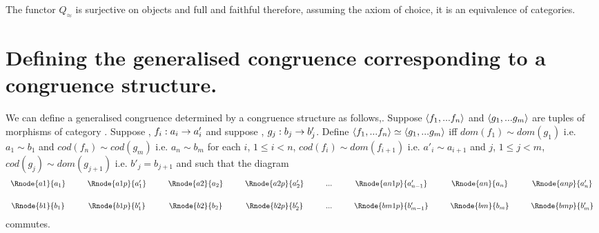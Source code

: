 \documentclass[10pt,a4paper]{article}
\theoremstyle{remark}
\begin{document}
The functor $Q_\approx$ is surjective on objects and full and faithful therefore, assuming the axiom of choice, it is an equivalence of categories. 

\section{Defining the generalised congruence corresponding to a congruence structure.}

We can define a generalised congruence determined by a congruence structure as follows,.
Suppose 
$\langle f_1,...f_n\rangle$ and $\langle g_1,...g_m\rangle$ are tuples of morphisms of category \catc. Suppose 
\foreachi, $f_i:a_i \rightarrow a'_i$ and suppose \foreachj[m], $g_j: b_j \rightarrow b'_j$.
Define 
$\langle f_1,...f_n\rangle\simeq\langle g_1,...g_m\rangle$ iff $dom(f_1) \sim dom(g_1)$ i.e. $a_1 \sim b_1$ and
$cod(f_n) \sim cod(g_m)$ i.e. $a_n \sim b_m$
for each $i$, $1 \leq i <n$, $cod(f_i) \sim dom(f_{i+1})$ i.e.  $a'_i \sim a_{i+1}$
and $j$, $1 \leq j < m$, $cod(g_j) \sim dom(g_{j+1})$ i.e. $b'_j= b_{j+1}$ and such that
the diagram
\begin{equation*}
\begin{array}{cp{.3cm}cp{.3cm}cp{.3cm}cp{.3cm}cp{.3cm}cp{.3cm}cp{.3cm}c}
\Rnode{a1}{a_1} && \Rnode{a1p}{a'_1} && \Rnode{a2}{a_2} && \Rnode{a2p}{a'_2} && ... 
&&\Rnode{an1p}{a'_{n-1}}&&\Rnode{an}{a_n}&&\Rnode{anp}{a'_n}         \\ [0.6cm]
\Rnode{b1}{b_1} &&  \Rnode{b1p}{b'_1} && \Rnode{b2}{b_2} && \Rnode{b2p}{b'_2} && ... 
&&\Rnode{bm1p}{b'_{m-1}}&&\Rnode{bm}{b_m}&&\Rnode{bmp}{b'_m}                 
\end{array}
\end{equation*}
commutes.

 

\end{document}
